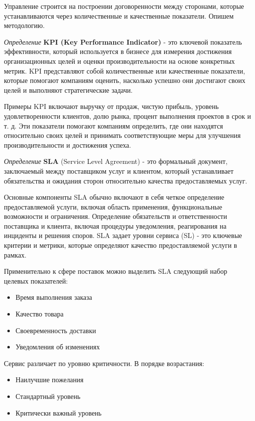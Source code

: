 Управление строится на построении договоренности между сторонами, которые устанавливаются через количественные и качественные показатели. Опишем методологию.

\textit{Определение} \textbf{KPI (Key Performance Indicator)} - это ключевой показатель эффективности, который используется в бизнесе для измерения достижения организационных целей и оценки производительности на основе конкретных метрик. KPI представляют собой количественные или качественные показатели, которые помогают компаниям оценить, насколько успешно они достигают своих целей и выполняют стратегические задачи.

Примеры KPI включают выручку от продаж, чистую прибыль, уровень удовлетворенности клиентов, долю рынка, процент выполнения проектов в срок и т. д. Эти показатели помогают компаниям определить, где они находятся относительно своих целей и принимать соответствующие меры для улучшения производительности и достижения успеха.

\textit{Определение} \textbf{SLA} (Service Level Agreement) - это формальный документ, заключаемый между поставщиком услуг  и клиентом, который устанавливает обязательства и ожидания сторон относительно качества предоставляемых услуг. 

Основные компоненты SLA обычно включают в себя четкое определение предоставляемой услуги, включая область применения, функциональные возможности и ограничения. Определение обязательств и ответственности поставщика и клиента, включая процедуры уведомления, реагирования на инциденты и решения споров. SLA задает уровни сервиса (SL) - это ключевые критерии и метрики, которые определяют качество предоставляемой услуги в рамках.

Применительно к сфере поставок можно выделить SLA следующий набор целевых показателей:
\begin{itemize}
    \item Время выполнения заказа
    \item Качество товара
    \item Своевременность доставки
    \item Уведомления об изменениях
\end{itemize}

Сервис различает по уровню критичности. В порядке возрастания:
\begin{itemize}
    \item Наилучшие пожелания
    \item Стандартный уровень
    \item Критически важный уровень
\end{itemize}


